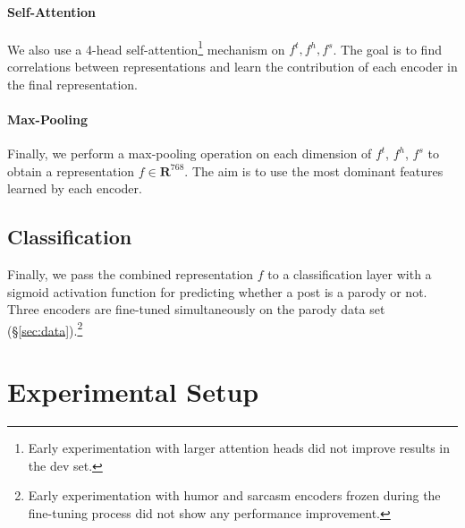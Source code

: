 \documentclass[11pt]{article}
\begin{document}
\paragraph{Self-Attention} We also use a 4-head self-attention\footnote{Early experimentation with larger attention heads did not improve results in the dev set.} mechanism \cite{NIPS2017_3f5ee243} on $f^t, f^h, f^s$. The goal is to find correlations between representations and learn the contribution of each encoder in the final representation. %

\paragraph{Max-Pooling} Finally, we perform a max-pooling operation on each dimension of $f^t$, $f^h$, $f^s$ to obtain a representation $f \in \mathbf{R}^{768}$. The aim is to use the most dominant features learned by each encoder. %

\subsection{Classification}
Finally, we pass the combined representation $f$ to a classification layer with a sigmoid activation function for predicting whether a post is a parody or not. Three encoders are fine-tuned simultaneously on the parody data set (\S \ref{sec:data}).\footnote{Early experimentation with humor and sarcasm encoders frozen during the fine-tuning process did not show any performance improvement.}


\section{Experimental Setup}
\end{document}
